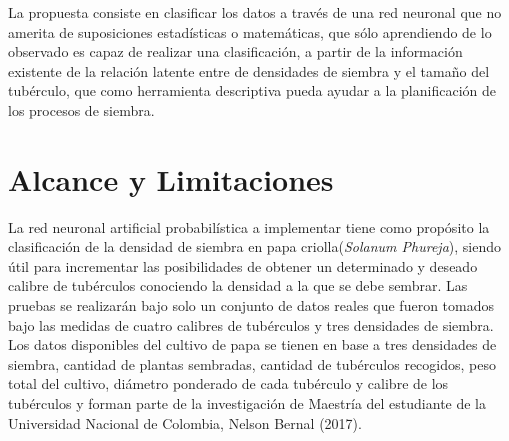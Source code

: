 La propuesta consiste en clasificar los datos a través de una red neuronal que no amerita de suposiciones estadísticas o matemáticas, que sólo aprendiendo de lo observado es capaz de realizar una clasificación, a partir de la información existente de la relación latente entre de densidades de siembra y el tamaño del tubérculo, que como herramienta descriptiva pueda ayudar a la planificación de los procesos de siembra.\\



\section{Alcance y Limitaciones}

La red neuronal artificial probabilística a implementar tiene como propósito la clasificación de la densidad de siembra en papa criolla(\textit{Solanum Phureja}), siendo útil para incrementar las posibilidades de obtener un determinado y deseado calibre de tubérculos conociendo la densidad a la que se debe sembrar.  Las pruebas se realizarán bajo solo un conjunto de datos reales que fueron tomados bajo las medidas de cuatro calibres de tubérculos y tres densidades de siembra.\\

Los datos disponibles del cultivo de papa se tienen en base a tres densidades de siembra, cantidad de plantas sembradas, cantidad de tubérculos recogidos, peso total del cultivo, diámetro ponderado de cada tubérculo y calibre de los tubérculos y forman parte de la investigación de Maestría del estudiante de la Universidad Nacional de Colombia, Nelson Bernal (2017).\\
\\

